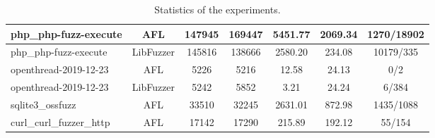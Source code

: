 \begin{table}[!t]
\begin{adjustbox}{angle=90}
{\begin{tabular}{|l|c|c|c|c|c|c|}
        \hline
        php\_php-fuzz-execute    & AFL       & 147945                                                         & 169447                                                         & 5451.77                                              & 2069.34                                              & 1270/18902                                                        \\[2ex]
        \hline
        php\_php-fuzz-execute    & LibFuzzer & 145816                                                         & 138666                                                         & 2580.20                                              & 234.08                                               & 10179/335                                                         \\[2ex] 
        \hline
        openthread-2019-12-23    & AFL       & 5226                                                           & 5216                                                           & 12.58                                                & 24.13                                                & 0/2                                                               \\[2ex]
        \hline
        openthread-2019-12-23    & LibFuzzer & 5242                                                           & 5852                                                           & 3.21                                                 & 24.24                                                & 6/384                                                             \\[2ex]
        \hline
        sqlite3\_ossfuzz         & AFL       & 33510                                                          & 32245                                                          & 2631.01                                              & 872.98                                               & 1435/1088                                                         \\[2ex]
        \hline
        curl\_curl\_fuzzer\_http & AFL       & 17142                                                          & 17290                                                          & 215.89                                               & 192.12                                               & 55/154                                                            \\[2ex]
        \hline
        \end{tabular}}
    \end{adjustbox}
    \caption{Statistics of the experiments.}
    \label{table:all}
\end{table}

